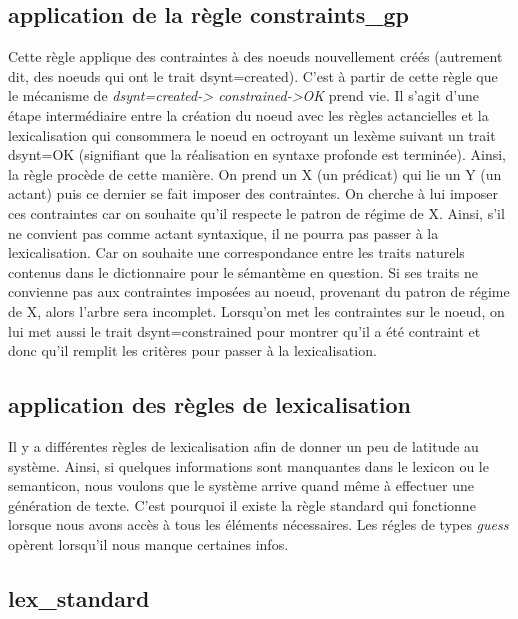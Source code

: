 \subsection{application de la règle constraints{\_}gp}
Cette règle applique des contraintes à des noeuds nouvellement créés (autrement dit, des noeuds qui ont le trait dsynt=created). C'est à partir de cette règle que le mécanisme de \emph{dsynt=created-> constrained->OK} prend vie. Il s'agit d'une étape intermédiaire entre la création du noeud avec les règles actancielles et la lexicalisation qui consommera le noeud en octroyant un lexème suivant un trait dsynt=OK (signifiant que la réalisation en syntaxe profonde est terminée). Ainsi, la règle procède de cette manière. On prend un X (un prédicat) qui lie un Y (un actant) puis ce dernier se fait imposer des contraintes. On cherche à lui imposer ces contraintes car on souhaite qu'il respecte le patron de régime de X. Ainsi, s'il ne convient pas comme actant syntaxique, il ne pourra pas passer à la lexicalisation. Car on souhaite une correspondance entre les traits naturels contenus dans le dictionnaire pour le sémantème en question. Si ses traits ne convienne pas aux contraintes imposées au noeud, provenant du patron de régime de X, alors l'arbre sera incomplet. Lorsqu'on met les contraintes sur le noeud, on lui met aussi le trait dsynt=constrained pour montrer qu'il a été contraint et donc qu'il remplit les critères pour passer à la lexicalisation.

\subsection{application des règles de lexicalisation}

Il y a différentes règles de lexicalisation afin de donner un peu de latitude au système. Ainsi, si quelques informations sont manquantes dans le lexicon ou le semanticon, nous voulons que le système arrive quand même à effectuer une génération de texte. C'est pourquoi il existe la règle standard qui fonctionne lorsque nous avons accès à tous les éléments nécessaires. Les régles de types \emph{guess} opèrent lorsqu'il nous manque certaines infos. 

\subsection{lex{\_}standard}

